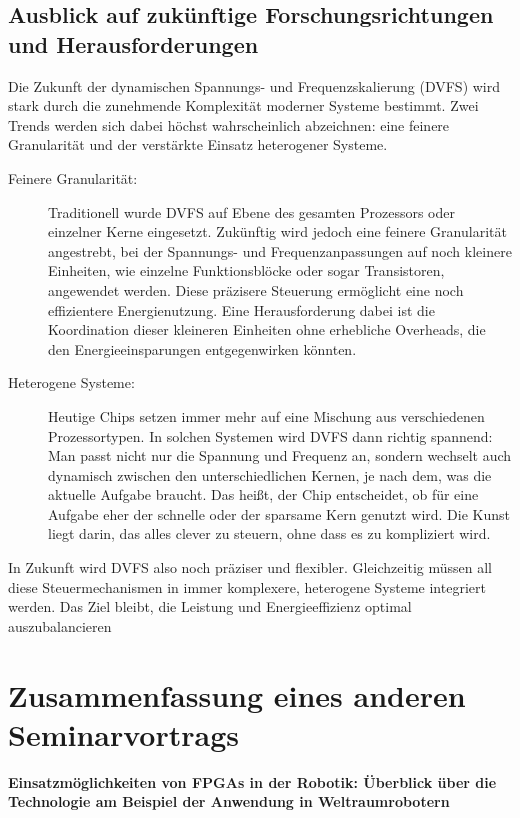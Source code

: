 \documentclass[footmark=none]{tubaf-thesis}
\begin{document}
    	\section{Ausblick auf zukünftige Forschungsrichtungen und Herausforderungen}
    		Die Zukunft der dynamischen Spannungs- und Frequenzskalierung (DVFS) wird stark durch die zunehmende Komplexität moderner Systeme bestimmt. Zwei Trends werden sich dabei höchst wahrscheinlich abzeichnen: eine feinere Granularität und der verstärkte Einsatz heterogener Systeme.
    		
    		\begin{description}
    			\item[Feinere Granularität:] Traditionell wurde DVFS auf Ebene des gesamten Prozessors oder einzelner Kerne eingesetzt. Zukünftig wird jedoch eine feinere Granularität angestrebt, bei der Spannungs- und Frequenzanpassungen auf noch kleinere Einheiten, wie einzelne Funktionsblöcke oder sogar Transistoren, angewendet werden. Diese präzisere Steuerung ermöglicht eine noch effizientere Energienutzung. Eine Herausforderung dabei ist die Koordination dieser kleineren Einheiten ohne erhebliche Overheads, die den Energieeinsparungen entgegenwirken könnten.
    			\item[Heterogene Systeme:] Heutige Chips setzen immer mehr auf eine Mischung aus verschiedenen Prozessortypen. In solchen Systemen wird DVFS dann richtig spannend: Man passt nicht nur die Spannung und Frequenz an, sondern wechselt auch dynamisch zwischen den unterschiedlichen Kernen, je nach dem, was die aktuelle Aufgabe braucht. Das heißt, der Chip entscheidet, ob für eine Aufgabe eher der schnelle oder der sparsame Kern genutzt wird. Die Kunst liegt darin, das alles clever zu steuern, ohne dass es zu kompliziert wird.
    		\end{description}
    		
    	In Zukunft wird DVFS also noch präziser und flexibler. Gleichzeitig müssen all diese Steuermechanismen in immer komplexere, heterogene Systeme integriert werden. Das Ziel bleibt, die Leistung und Energieeffizienz optimal auszubalancieren
    	
    \chapter{Zusammenfassung eines anderen Seminarvortrags}
    	
    		{\Large \textbf{Einsatzmöglichkeiten von FPGAs in der Robotik: Überblick über die Technologie am Beispiel der Anwendung in Weltraumrobotern}} \\
    	
\end{document}
